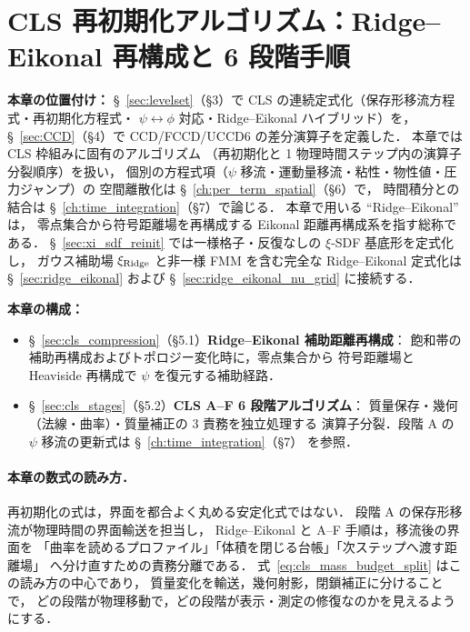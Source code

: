 %
\section{CLS 再初期化アルゴリズム：Ridge--Eikonal 再構成と 6 段階手順}
\label{ch:cls_specific}

\noindent\textbf{本章の位置付け：}
§~\ref{sec:levelset}（§3）で CLS の連続定式化（保存形移流方程式・再初期化方程式・
$\psi\leftrightarrow\phi$ 対応・Ridge--Eikonal ハイブリッド）を，
§~\ref{sec:CCD}（§4）で CCD/FCCD/UCCD6 の差分演算子を定義した．
本章では CLS 枠組みに固有のアルゴリズム
（再初期化と 1 物理時間ステップ内の演算子分裂順序）を扱い，
個別の方程式項（$\psi$ 移流・運動量移流・粘性・物性値・圧力ジャンプ）の
空間離散化は §~\ref{ch:per_term_spatial}（§6）で，
時間積分との結合は §~\ref{ch:time_integration}（§7）で論じる．
本章で用いる ``Ridge--Eikonal'' は，
零点集合から符号距離場を再構成する Eikonal 距離再構成系を指す総称である．
§~\ref{sec:xi_sdf_reinit} では一様格子・反復なしの $\xi$-SDF 基底形を定式化し，
ガウス補助場 $\xi_{\text{Ridge}}$ と非一様 FMM を含む完全な Ridge--Eikonal 定式化は
§~\ref{sec:ridge_eikonal} および §~\ref{sec:ridge_eikonal_nu_grid} に接続する．

\noindent\textbf{本章の構成：}
\begin{itemize}
  \item \S~\ref{sec:cls_compression}（§5.1）\textbf{Ridge--Eikonal 補助距離再構成}：
        飽和帯の補助再構成およびトポロジー変化時に，零点集合から
        符号距離場と Heaviside 再構成で $\psi$ を復元する補助経路．
  \item \S~\ref{sec:cls_stages}（§5.2）\textbf{CLS A--F 6 段階アルゴリズム}：
        質量保存・幾何（法線・曲率）・質量補正の 3 責務を独立処理する
        演算子分裂．段階 A の $\psi$ 移流の更新式は §~\ref{ch:time_integration}（§7）
        を参照．
\end{itemize}

\paragraph{本章の数式の読み方．}
再初期化の式は，界面を都合よく丸める安定化式ではない．
段階 A の保存形移流が物理時間の界面輸送を担当し，
Ridge--Eikonal と A--F 手順は，移流後の界面を
「曲率を読めるプロファイル」「体積を閉じる台帳」「次ステップへ渡す距離場」
へ分け直すための責務分離である．
式~\eqref{eq:cls_mass_budget_split} はこの読み方の中心であり，
質量変化を輸送，幾何射影，閉鎖補正に分けることで，
どの段階が物理移動で，どの段階が表示・測定の修復なのかを見えるようにする．

